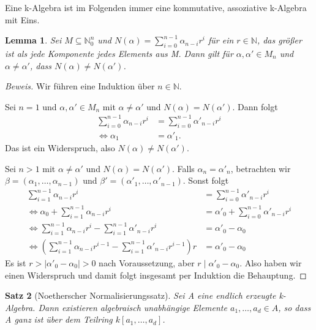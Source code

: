 \documentclass{article}
\newtheorem{satz}{Satz}
\newtheorem{lemma}[satz]{Lemma}
\begin{document}
	Eine k-Algebra ist im Folgenden immer eine kommutative, assoziative
	k-Algebra mit Eins.
	
	\begin{lemma}\label{tupelvergleich}
	Sei \(M \subseteq \mathbb{N}^n_0\) und \(N(\alpha) = \sum^{n-1}_{i=0}
	\alpha_{n-i}r^i\) für ein \(r \in \mathbb{N}\), das größer ist
	als jede Komponente jedes Elements aus M. Dann gilt für \(\alpha, \alpha'
	\in M_n\) und \(\alpha \neq \alpha'\), dass \(N(\alpha) \neq N(\alpha')\).
	\end{lemma}

	\begin{proof}[Beweis]
	Wir führen eine Induktion über \(n \in \mathbb{N}\).

	Sei \(n = 1\) und \(\alpha, \alpha' \in M_n\) mit \(\alpha \neq \alpha'\)
	und \(N(\alpha) = N(\alpha')\). Dann folgt
	\begin{align*} \sum^{n-1}_{i=0} \alpha_{n-i}r^i &= \sum^{n-1}_{i=0}
	\alpha'_{n-i}r^i \\ \Leftrightarrow \alpha_{1} &= \alpha'_{1}. \end{align*}
	Das ist ein Widerspruch, also \(N(\alpha) \neq N(\alpha')\).

	Sei \(n > 1\) mit \(\alpha \neq \alpha'\) und \(N(\alpha) = N(\alpha')\).
	Falls \(\alpha_n = \alpha'_n\), betrachten wir \(\beta = (\alpha_1,\ldots,
	\alpha_{n-1})\) und \(\beta' = (\alpha'_1,\ldots,\alpha'_{n-1})\).
	Sonst folgt
	\begin{align*} \sum^{n-1}_{i=1} \alpha_{n-i}r^i &= \sum^{n-1}_{i=0}
	\alpha'_{n-i}r^i \\
	\Leftrightarrow \alpha_0 + \sum^{n-1}_{i=1} \alpha_{n-i}r^i &=
	\alpha'_0 + \sum^{n-1}_{i=0} \alpha'_{n-i}r^i \\
	\Leftrightarrow \sum^{n-1}_{i=1} \alpha_{n-i}r^i - \sum^{n-1}_{i=1}
	\alpha'_{n-i}r^i &= \alpha'_0 - \alpha_0 \\
	\Leftrightarrow (\sum^{n-1}_{i=1} \alpha_{n-i}r^{i-1} - \sum^{n-1}_{i=1}
	\alpha'_{n-i}r^{i-1})r &= \alpha'_0 - \alpha_0
	\end{align*}
	Es ist \(r > |\alpha'_0 - \alpha_0| > 0\) nach Voraussetzung, aber
	\(r\;|\;\alpha'_0 - \alpha_0\). Also haben wir einen Widerspruch und damit
	folgt insgesamt per Induktion die Behauptung.
	\end{proof}

	\begin{satz}[Noetherscher Normalisierungssatz]
	Sei A eine endlich erzeugte k-Algebra. Dann existieren algebraisch
	unabhängige Elemente \(a_1, \ldots, a_d \in A\), so dass A ganz ist über
	dem Teilring \(k[a_1, \ldots, a_d]\).
	\end{satz}
\end{document}

